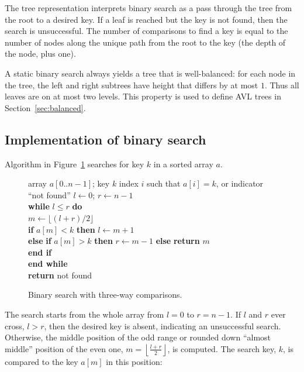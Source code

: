The tree representation interprets binary search
as a pass through the tree from the root to a desired key.
If a leaf is reached but the key is not found, then the search
is unsuccessful. The number of comparisons to find a key 
is equal to the number of nodes along the unique path from the root to
the key (the depth of the node, plus one).

A static binary search always yields a tree that is well-balanced:
for each node in the tree, the left and right subtrees have height that differs 
by at most $1$. Thus all leaves are on at most two levels. This property is used 
to define AVL trees in Section~\ref{sec:balanced}.


\subsection{Implementation of binary search}

Algorithm  in Figure~\ref{bin-search} 
searches for key \(k\) in a sorted array $a$.

\begin{figure}[htb]
\hspace*{.7in}\begin{minipage}{5in}
{array $a[0..n-1]$; key $k$}
{index $i$ such that $a[i] = k$, or indicator ``not found''}
{
\> $l \leftarrow 0$; $r\leftarrow n-1$\\
\> \textbf{while} $l \le r$ \textbf{do}\\ 
\> \>$m\leftarrow\lfloor(l+r)/2\rfloor$\\
\> \>\textbf{if} $a[m] < k$
             \textbf{then} $l \leftarrow m+1$\\
\> \>\textbf{else} \textbf{if} $a[m] > k$ 
             \textbf{then} $r\leftarrow m-1$
             \textbf{else} \textbf{return} $m$\\
\> \>\textbf{end if}\\
\> \textbf{end while}\\
\> \textbf{return} \textsf{not found}\\
}
\end{minipage}
\caption{\label{bin-search} Binary search with three-way comparisons.}
\end{figure}

The search starts from the whole
array from $l=0$ to $r=n-1$. If \(l\) and \(r\) ever
cross, $l > r$, then the desired
key is absent, indicating an unsuccessful search. Otherwise,
the middle position of the odd range or rounded down
``almost middle'' position  of 
the even one, $m=\left\lfloor\frac{l+r}{2}\right\rfloor$,  is computed.
The search key, $k$, is compared to the key $a[m]$ in this position:

